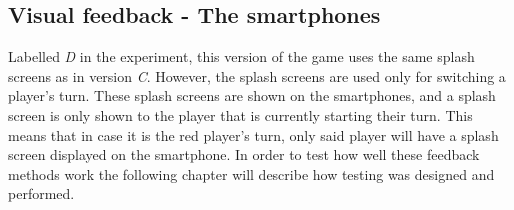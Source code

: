 \subsection{Visual feedback - The smartphones}\label{sub:visual_smartphone}
Labelled \textit{D} in the experiment, this version of the game uses the same splash screens as in version \textit{C}. However, the splash screens are used only for switching a player's turn. These splash screens are shown on the smartphones, and a splash screen is only shown to the player that is currently starting their turn. This means that in case it is the red player's turn, only said player will have a splash screen displayed on the smartphone. In order to test how well these feedback methods work the following chapter will describe how testing was designed and performed.
